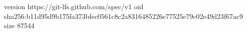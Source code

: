 version https://git-lfs.github.com/spec/v1
oid sha256:b11d95d9b175fa373bfec0561c8c2a8316485226e77525e79c02e49d23f67ac9
size 87544
